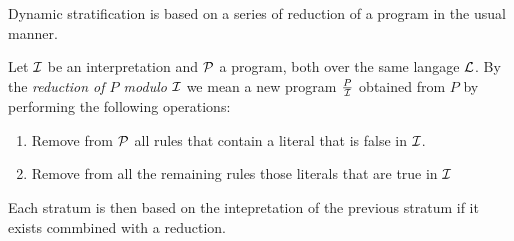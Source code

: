 Dynamic stratification is based on a series of reduction of a program
in the usual manner.

\begin{definition} \label{def:reduction}
%                                                                                
Let $\cI$ be an interpretation and $\cP$ a program, both over the same
langage $\cL$.  By the {\em reduction of $P$ modulo $\cI$} we mean a
new program $\frac{P}{\cI}$ obtained from $P$ by performing the
following operations:
\begin{enumerate}
\item Remove from $\cP$ all rules that contain a literal that is false
  in $\cI$.
\item Remove from all the remaining rules those literals that are true
  in $\cI$
\end{enumerate}
\end{definition}

Each stratum is then based on the intepretation of the previous
stratum if it exists commbined with a reduction.

